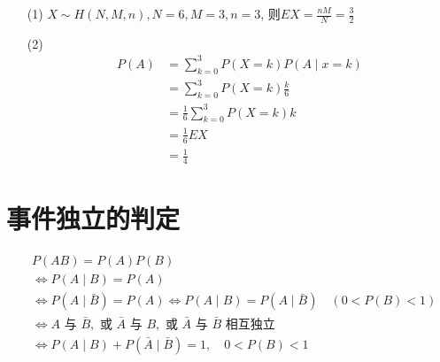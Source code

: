 \documentclass[12pt, a4paper, oneside, UTF8]{ctexbook}
\begin{document}
\begin{enumerate}[label=\arabic*.,start=9]
\begin{solution}[使用超几何分布]
    \begin{enumerate}
    \item [(1)] $X\sim H(N, M, n), N = 6, M = 3, n = 3$, 则$EX=\frac{nM}{N}=\frac{3}{2}$
    \item [(2)]
    \begin{align*}
        P(A) &=\sum_{k=0}^{3}P(X=k)P(A\mid x=k) \\
        &= \sum_{k=0}^{3}P(X=k) \frac{k}{6} \\
        &= \frac{1}{6}\sum_{k=0}^{3}P(X=k)k \\
        &= \frac{1}{6}EX \\
        &= \frac{1}{4}
    \end{align*}
    \end{enumerate}
\end{solution}

\end{enumerate}

\section{事件独立的判定}

\begin{remark}[事件独立的充要条件]
\begin{align*}
        & P(AB) = P(A)P(B) \\
        & \iff P(A\mid B) = P(A) \\
        & \iff P(A\mid \bar{B}) = P(A) \iff P(A\mid B) = P(A\mid \bar{B}) \quad (0 < P(B) < 1) \\
        & \iff A \text{ 与 } \bar{B}, \text{ 或 } \bar{A} \text{ 与 } B, \text{ 或 } \bar{A} \text{ 与 } \bar{B} \text{ 相互独立} \\
        & \iff P(A\mid B) + P(\bar{A} \mid \bar{B}) = 1, \quad 0 < P(B) < 1
\end{align*}
\end{remark}
\end{document}
